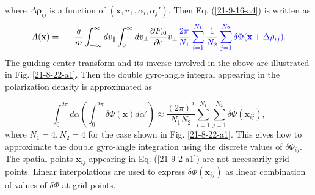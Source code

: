\documentclass{article}
\newcommand{\tmcolor}[2]{{\color{#1}{#2}}}
\begin{document}
where $\Delta \mathbf{\rho}_{i j}$ is a function of $(\mathbf{x}, v_{\perp},
\alpha_i, \alpha_j')$. Then Eq. (\ref{21-9-16-a4}) is written as
\begin{eqnarray}
  A (\mathbf{x}) & = & - \frac{q}{m}  \int_{- \infty}^{\infty} d v_{\parallel}
  \int_0^{\infty} d v_{\perp} \frac{\partial F_{i 0}}{\partial \varepsilon}
  v_{\perp} \tmcolor{blue}{\frac{2 \pi}{N_1} \sum_{i = 1}^{N_1} \frac{1}{N_2} 
  \sum_{j = 1}^{N_2} \delta \Phi (\mathbf{x} + \Delta \mathbf{\rho}_{i j})} . 
  \label{22-11-8-1}
\end{eqnarray}
The guiding-center transform and its inverse involved in the above are
illustrated in Fig. \ref{21-8-22-a1}. Then the double gyro-angle integral
appearing in the polarization density is approximated as


\begin{equation}
  \label{21-9-2-a1} \int_0^{2 \pi} d \alpha \left( \int_0^{2 \pi} \delta \Phi
  (\mathbf{x}) d \alpha' \right) \approx \frac{(2 \pi)^2}{N_1 N_2}  \sum_{i =
  1}^{N_1} \sum_{j = 1}^{N_2} \delta \Phi (\mathbf{x}_{i j}),
\end{equation}
where $N_1 = 4, N_2 = 4$ for the case shown in Fig. \ref{21-8-22-a1}. This
gives how to approximate the double gyro-angle integration using the discrete
values of $\delta \Phi_{i j}$. The spatial points $\mathbf{x}_{i j}$ appearing
in Eq. (\ref{21-9-2-a1}) are not necessarily grid points. Linear
interpolations are used to express $\delta \Phi (\mathbf{x}_{i j})$ as linear
combination of values of $\delta \Phi$ at grid-points.

\

\
\end{document}

